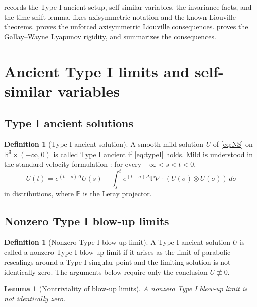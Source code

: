\documentclass[11pt]{amsart}
\theoremstyle{plain}
\newtheorem{lemma}[theorem]{Lemma}
\theoremstyle{definition}
\newtheorem{definition}[theorem]{Definition}
\theoremstyle{remark}
\numberwithin{equation}{section}
\begin{document}
 records the Type I ancient setup, self-similar variables, the
invariance facts, and the time-shift lemma.
 fixes axisymmetric notation and the
known Liouville theorems.   proves the
unforced axisymmetric Liouville consequences.
 proves the Gallay--Wayne Lyapunov rigidity, and
 summarizes the consequences.

\section{Ancient Type I limits and self-similar variables}
\label{sec:typeI}

\subsection{Type I ancient solutions}

\begin{definition}[Type I ancient solution]
\label{def:typeI-ancient}
A smooth mild solution \(U\) of \eqref{eq:NS} on
\(\mathbb R^3\times(-\infty,0)\) is called Type I ancient if
\eqref{eq:typeI} holds.  Mild is understood in the standard velocity
formulation \cite{Kato1984,Sohr2001}: for every \(-\infty<s<t<0\),
\begin{equation}\label{eq:mild-formula}
   U(t)=e^{(t-s)\Delta}U(s)
   -\int_s^t e^{(t-\sigma)\Delta}\mathbb P\nabla\cdot
      (U(\sigma)\otimes U(\sigma))\,d\sigma
\end{equation}
in distributions, where \(\mathbb P\) is the Leray projector.
\end{definition}

\subsection{Nonzero Type I blow-up limits}

\begin{definition}[Nonzero Type I blow-up limit]
\label{def:nonzero-typeI-limit}
A Type I ancient solution \(U\) is called a nonzero Type I blow-up limit if it
arises as the limit of parabolic rescalings around a Type I singular point and
the limiting solution is not identically zero.  The arguments below require
only the conclusion \(U\not\equiv0\).
\end{definition}

\begin{lemma}[Nontriviality of blow-up limits]
\label{lem:nonzero-typeI-limit}
   A nonzero Type I blow-up limit is not identically zero.
\end{lemma}
\end{document}
